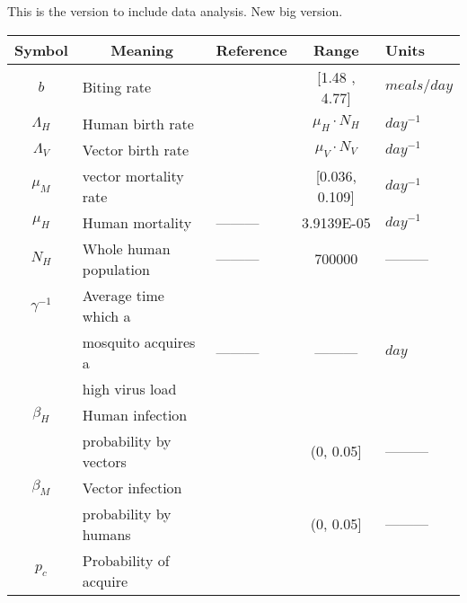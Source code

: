 This is the version to include data analysis.
New big version.
%
%
\begin{table}[htb]
	\begin{center}
		\begin{tabular}{cllcl}
			\toprule
				Symbol
				&\multicolumn{1}{c}{Meaning} 
				&Reference
				& Range 
				& Units
			\\
			\midrule
				$b$
				& Biting rate
				&\cite{YasunoM1990}
				&[1.48 , 4.77] 
				&$\si{meals \per day}$ 
			\\
				$\Lambda_H$
				& Human birth rate
				&
				& $\mu_H \cdot N_H$
				& $\si{day^{-1}}$
			\\
				$\Lambda_V$	
				& Vector birth rate
				&
				& $\mu_V \cdot N_V$
				&$\si{day^{-1}}$
			\\
				$\mu_M$
				&	vector mortality rate
				&\cite{Muir1998,YANG2009} 
				& [\num{0.036}, \num{0.109}] 
				& $\si{day^{-1}}$
			\\
				$\mu_H$
				& Human mortality
				& ---------
				&\num{3.9139E-05} 
				&$\si{day^{-1}}$
			\\
				$N_H$
				& Whole human population
				& ---------
				&\num{700000}
				& ---------
			\\
				$\gamma^{-1}$
				& Average time which a
				&
				&
				&
			\\
				&mosquito acquires a
				& ---------
				& ---------
				& $\si{day}$
			\\
				& high virus load
				&
				&
				&
			\\
				$\beta_H$ 
				& Human infection
				&
				&
			\\
				& probability  by vectors
				&
				& (\num{0}, \num{0.05}] 
				& ---------
			\\
				$\beta_M$
				& Vector infection 
				&
				&
				&
			\\
				& probability by humans
				&
				& (\num{0}, \num{0.05}] 
				& ---------
			\\
				$p_c$
				& Probability of acquire  
					 
			\\
				

\end{tabular}
\end{center}
\end{table}
